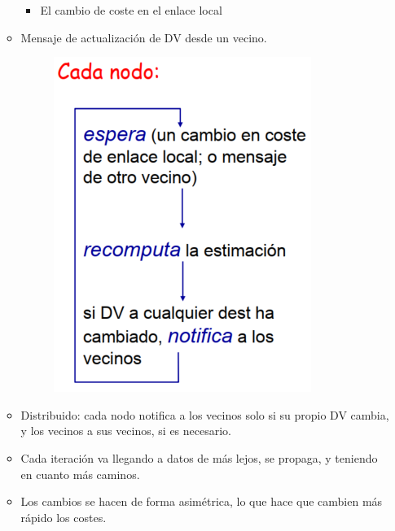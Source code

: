 \documentclass[12pt, twoside, openright]{report} %
\begin{document}
\begin{itemize}
\begin{itemize}
      \begin{itemize}
      \item
        El cambio de coste en el enlace local
      \end{itemize}
    \item
      Mensaje de actualización de DV desde un vecino.
	  \begin{figure}[H]
		{\includegraphics[scale=.4]{Untitled 43.png}}
	\end{figure}
    \item
      Distribuido: cada nodo notifica a los vecinos solo si su propio DV
      cambia, y los vecinos a sus vecinos, si es necesario.
    \item
      Cada iteración va llegando a datos de más lejos, se propaga, y
      teniendo en cuanto más caminos.
    \item
      Los cambios se hacen de forma asimétrica, lo que hace que cambien
      más rápido los costes.


\end{itemize}
\end{itemize}
\end{document}
